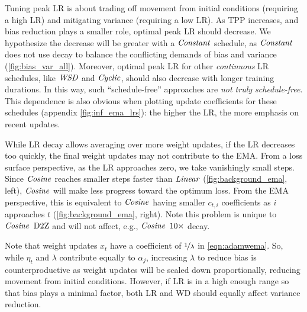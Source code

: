 Tuning peak LR is about trading off movement from initial
conditions (requiring a high LR) and mitigating variance (requiring a
low LR).  As TPP increases, and bias reduction plays a smaller role,
optimal peak LR should decrease.  We hypothesize the decrease will
be greater with a $\mbox{\emph{Constant}}$ schedule, as $\mbox{\emph{Constant}}$ does not use
decay to balance the conflicting demands of bias and variance
(\cref{fig:bias_var_all}).
%
Moreover, optimal peak LR for other \emph{continuous} LR schedules,
like $\mbox{\emph{WSD}}$ and $\mbox{\emph{Cyclic}}$, should also decrease with longer training
durations.  In this way, such ``schedule-free'' approaches are
\emph{not truly schedule-free}.  This dependence is also obvious when
plotting update coefficients for these schedules (appendix
\cref{fig:inf_ema_lrs}): the higher the LR, the more emphasis on
recent updates.


While LR decay allows averaging over more weight updates, if the LR
decreases too quickly, the final weight updates may not contribute to
the EMA\@.  From a loss surface perspective, as the LR approaches
zero, we take vanishingly small steps.  Since $\mbox{\emph{Cosine}}$ reaches
smaller steps faster than $\mbox{\emph{Linear}}$ (\cref{fig:background_ema}, left),
$\mbox{\emph{Cosine}}$ will make less progress toward the optimum loss.
%
From the EMA perspective, this is equivalent to $\mbox{\emph{Cosine}}$ having
smaller $c_{t,i}$ coefficients as $i$ approaches $t$
(\cref{fig:background_ema}, right).
%
Note this problem is unique to $\mbox{\emph{Cosine}}$ $\mbox{D2Z}$ and will not affect,
e.g., $\mbox{\emph{Cosine}}$ $\mbox{10}\times$ decay.


Note that weight updates $x_t$ have a coefficient of
$\nicefrac{1}{\lambda}$ in \cref{eqn:adamwema}.  So, while $\eta_t$
and $\lambda$ contribute equally to $\alpha_j$, increasing $\lambda$
to reduce bias is counterproductive as weight updates will be scaled
down proportionally, reducing movement from initial conditions.
%
However, if LR is in a high enough range so that bias plays a minimal
factor, both LR and WD should equally affect variance reduction.

